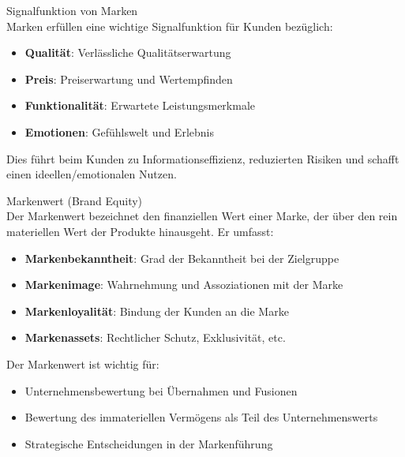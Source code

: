 \begin{definition}{Signalfunktion von Marken}\\
Marken erfüllen eine wichtige Signalfunktion für Kunden bezüglich:
\begin{itemize}
    \item \textbf{Qualität}: Verlässliche Qualitätserwartung
    \item \textbf{Preis}: Preiserwartung und Wertempfinden
    \item \textbf{Funktionalität}: Erwartete Leistungsmerkmale
    \item \textbf{Emotionen}: Gefühlswelt und Erlebnis
\end{itemize}

Dies führt beim Kunden zu Informationseffizienz, reduzierten Risiken und schafft einen ideellen/emotionalen Nutzen.
\end{definition}

\begin{concept}{Markenwert (Brand Equity)}\\
Der Markenwert bezeichnet den finanziellen Wert einer Marke, der über den rein materiellen Wert der Produkte hinausgeht. Er umfasst:
\begin{itemize}
    \item \textbf{Markenbekanntheit}: Grad der Bekanntheit bei der Zielgruppe
    \item \textbf{Markenimage}: Wahrnehmung und Assoziationen mit der Marke
    \item \textbf{Markenloyalität}: Bindung der Kunden an die Marke
    \item \textbf{Markenassets}: Rechtlicher Schutz, Exklusivität, etc.
\end{itemize}

Der Markenwert ist wichtig für:
\begin{itemize}
    \item Unternehmensbewertung bei Übernahmen und Fusionen
    \item Bewertung des immateriellen Vermögens als Teil des Unternehmenswerts
    \item Strategische Entscheidungen in der Markenführung
\end{itemize}
\end{concept}

